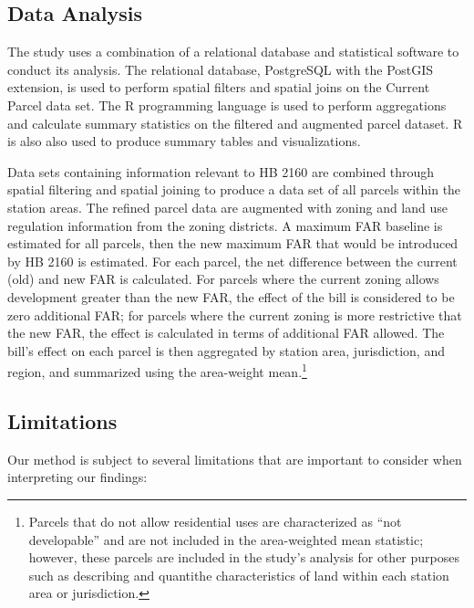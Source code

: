 \documentclass[
]{agujournal2019}
\begin{document}
\subsection{Data Analysis}\label{data-analysis}

The study uses a combination of a relational database and statistical
software to conduct its analysis. The relational database, PostgreSQL
with the PostGIS extension, is used to perform spatial filters and
spatial joins on the Current Parcel data set. The R programming language
is used to perform aggregations and calculate summary statistics on the
filtered and augmented parcel dataset. R is also also used to produce
summary tables and visualizations.

Data sets containing information relevant to HB 2160 are combined
through spatial filtering and spatial joining to produce a data set of
all parcels within the station areas. The refined parcel data are
augmented with zoning and land use regulation information from the
zoning districts. A maximum FAR baseline is estimated for all parcels,
then the new maximum FAR that would be introduced by HB 2160 is
estimated. For each parcel, the net difference between the current (old)
and new FAR is calculated. For parcels where the current zoning allows
development greater than the new FAR, the effect of the bill is
considered to be zero additional FAR; for parcels where the current
zoning is more restrictive that the new FAR, the effect is calculated in
terms of additional FAR allowed. The bill's effect on each parcel is
then aggregated by station area, jurisdiction, and region, and
summarized using the area-weight mean.\footnote{Parcels that do not
  allow residential uses are characterized as ``not developable'' and
  are not included in the area-weighted mean statistic; however, these
  parcels are included in the study's analysis for other purposes such
  as describing and quantithe characteristics of land within each
  station area or jurisdiction.}

\subsection{Limitations}\label{limitations}

Our method is subject to several limitations that are important to
consider when interpreting our findings:
\end{document}
